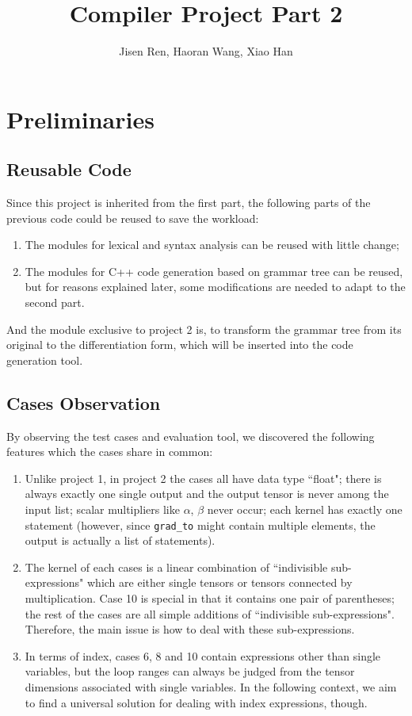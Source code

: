 \documentclass[a4paper,11pt]{article}
\begin{document}
	\title{Compiler Project Part 2}
	\author{Jisen Ren, Haoran Wang, Xiao Han}
	\maketitle
	\section{Preliminaries}
	\subsection{Reusable Code}
	Since this project is inherited from the first part, the following parts of the previous code could be reused to save the workload:
	\begin{enumerate}
		\item The modules for lexical and syntax analysis can be reused with little change;
		\item The modules for C++ code generation based on grammar tree can be reused, but for reasons explained later, some modifications are needed to adapt to the second part.
	\end{enumerate}
	\par 
	And the module exclusive to project 2 is, to transform the grammar tree from its original to the differentiation form, which will be inserted into the code generation tool.
	\subsection{Cases Observation}
	By observing the test cases and evaluation tool, we discovered the following features which the cases share in common:
	\begin{enumerate}
		\item Unlike project 1, in project 2 the cases all have data type ``float"; there is always exactly one single output and the output tensor is never among the input list; scalar multipliers like $\alpha$, $\beta$ never occur; each kernel has exactly one statement (however, since \texttt{grad\_to} might contain multiple elements, the output is actually a list of statements). 
		\item The kernel of each cases is a linear combination of ``indivisible sub-expressions" which are either single tensors or tensors connected by multiplication. Case 10 is special in that it contains one pair of parentheses; the rest of the cases are all simple additions of ``indivisible sub-expressions". Therefore, the main issue is how to deal with these sub-expressions. 
		\item In terms of index, cases 6, 8 and 10 contain expressions other than single variables, but the loop ranges can always be judged from the tensor dimensions associated with single variables. In the following context, we aim to find a universal solution for dealing with index expressions, though. 
	\end{enumerate}
\end{document}
